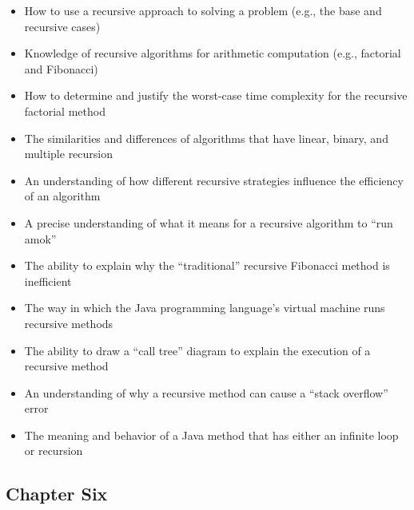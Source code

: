 \documentclass[11pt]{article}
\begin{document}
\begin{itemize}

  \setlength{\itemsep}{0.05in}

  \item How to use a recursive approach to solving a problem (e.g., the base
    and recursive cases)
  \item Knowledge of recursive algorithms for arithmetic computation (e.g., factorial
    and Fibonacci)
  \item How to determine and justify the worst-case time complexity for
    the recursive factorial method
  \item The similarities and differences of algorithms that have linear, binary, and multiple
    recursion
  \item An understanding of how different recursive strategies influence the
    efficiency of an algorithm
  \item A precise understanding of what it means for a recursive algorithm to
    ``run amok''
  \item The ability to explain why the ``traditional'' recursive Fibonacci
    method is inefficient
  \item The way in which the Java programming language's virtual machine runs recursive methods
  \item The ability to draw a ``call tree'' diagram to explain the
    execution of a recursive method
  \item An understanding of why a recursive method can cause a ``stack
    overflow'' error
  \item The meaning and behavior of a Java method that has either an infinite
    loop or recursion

\end{itemize}

\vspace*{-.2in}
\subsection*{Chapter Six}
\end{document}
